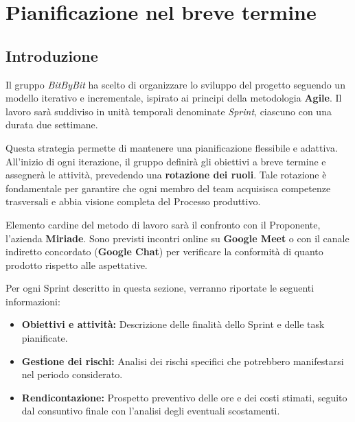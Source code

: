 \documentclass[a4paper,12pt]{article}
\begin{document}

\section{Pianificazione nel breve termine}\label{sec:pianificazione_breve_termine}

\subsection{Introduzione}
Il gruppo \textit{BitByBit} ha scelto di organizzare lo sviluppo del progetto seguendo un modello iterativo e incrementale, ispirato ai principi della metodologia \textbf{Agile}. Il lavoro sarà suddiviso in unità temporali denominate \textit{Sprint}, ciascuno con una durata due settimane.

Questa strategia permette di mantenere una pianificazione flessibile e adattiva. All'inizio di ogni iterazione, il gruppo definirà gli obiettivi a breve termine e assegnerà le attività, prevedendo una \textbf{rotazione dei ruoli}. Tale rotazione è fondamentale per garantire che ogni membro del team acquisisca competenze trasversali e abbia visione completa del Processo produttivo.

Elemento cardine del metodo di lavoro sarà il confronto con il Proponente, l'azienda \textbf{Miriade}. Sono previsti incontri online su \textbf{Google Meet} o con il canale indiretto concordato (\textbf{Google Chat}) per verificare la conformità di quanto prodotto rispetto alle aspettative.

Per ogni Sprint descritto in questa sezione, verranno riportate le seguenti informazioni:
\begin{itemize}
    \item \textbf{Obiettivi e attività:} Descrizione delle finalità dello Sprint e delle task pianificate.
    \item \textbf{Gestione dei rischi:} Analisi dei rischi specifici che potrebbero manifestarsi nel periodo considerato.
    \item \textbf{Rendicontazione:} Prospetto preventivo delle ore e dei costi stimati, seguito dal consuntivo finale con l'analisi degli eventuali scostamenti.
\end{itemize}

\end{document}
